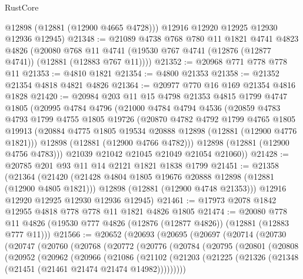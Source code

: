 \begin{lexlean}{RustCore}
\begin{coremodule}
        @12898
        (@12881 (@12900 @4665 @4728)))
      @12916
      @12920
      @12925
      @12930
      @12936
      @12945)
@21348 := @21089
    @4738
    @768
    @780
    @11
    @1821
    @4741
    @4823
    @4826
    (@20080 @768 @11 @4741 (@19530 @767 @4741 (@12876 (@12877 @4741)) (@12881 (@12883 @767 @11))))
@21352 := @20968 @771 @778 @778 @11
@21353 := @4810 @1821
@21354 := @4800 @21353
@21358 := @21352 @21354 @4818 @4821 @4826
@21364 := @20977 @770 @16 @169 @21354 @4816 @1828
@21420 := @20984
    @203
    @11
    @15
    @4798
    @21353
    @4815
    @1799
    @4747
    @1805
    (@20995
      @4784
      @4796
      (@21000
        @4784
        @4794
        @4536
        (@20859
          @4783
          @4793
          @1799
          @4755
          @1805
          @19726
          (@20870
            @4782
            @4792
            @1799
            @4765
            @1805
            @19913
            (@20884 @4775 @1805 @19534 @20888 @12898 (@12881 (@12900 @4776 @1821)))
            @12898
            (@12881 (@12900 @4766 @4782)))
          @12898
          (@12881 (@12900 @4756 @4783)))
        @21039
        @21042
        @21045
        @21049
        @21054
        @21060))
@21428 := @20785 @201 @93 @11 @14 @2121 @1821 @1838 @1799
@21451 := @21358
    (@21364
      (@21420
        (@21428 @4804 @1805 @19676 @20888 @12898 (@12881 (@12900 @4805 @1821)))
        @12898
        (@12881 (@12900 @4748 @21353)))
      @12916
      @12920
      @12925
      @12930
      @12936
      @12945)
@21461 := @17973 @2078 @1842 @12955 @4818 @778 @778 @11 @1821 @4826 @1805
@21474 := @20080
    @778
    @11
    @4826
    (@19530 @777 @4826 (@12876 (@12877 @4826)) (@12881 (@12883 @777 @11)))
@21566 := @20652
    (@20693
      (@20695
        (@20697
          (@20714
            (@20730
              (@20747
                (@20760
                  (@20768
                    (@20772
                      (@20776
                        (@20784
                          (@20795
                            (@20801
                              (@20808
                                (@20952
                                  (@20962
                                    (@20966
                                      (@21086
                                        (@21102
                                          (@21203
                                            (@21225
                                              (@21326
                                                (@21348
                                                  (@21451 (@21461 @21474 @21474 @14982)))))))))

\end{coremodule}
\end{lexlean}
